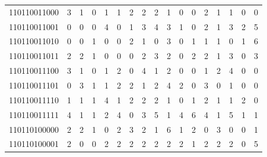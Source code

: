 \documentclass[10pt,a4paper]{article}
\begin{document}
\begin{longtable}{ |c|c|c|c|c|c|c|c|c|c|c|c|c|c|c|c|c| }
    110110011000              & 3                            & 1                                & 0                            & 1                              & 1   & 2   & 2   & 2   & 1   & 0   & 0   & 2   & 1   & 1   & 0   & 0   \\
    110110011001              & 0                            & 0                                & 0                            & 4                              & 0   & 1   & 3   & 4   & 3   & 1   & 0   & 2   & 1   & 3   & 2   & 5   \\
    110110011010              & 0                            & 0                                & 1                            & 0                              & 0   & 2   & 1   & 0   & 3   & 0   & 1   & 1   & 1   & 0   & 1   & 6   \\
    110110011011              & 2                            & 2                                & 1                            & 0                              & 0   & 0   & 2   & 3   & 2   & 0   & 2   & 2   & 1   & 3   & 0   & 3   \\
    110110011100              & 3                            & 1                                & 0                            & 1                              & 2   & 0   & 4   & 1   & 2   & 0   & 0   & 1   & 2   & 4   & 0   & 0   \\
    110110011101              & 0                            & 3                                & 1                            & 1                              & 2   & 2   & 1   & 2   & 4   & 2   & 0   & 3   & 0   & 1   & 0   & 0   \\
    110110011110              & 1                            & 1                                & 1                            & 4                              & 1   & 2   & 2   & 2   & 1   & 0   & 1   & 2   & 1   & 1   & 2   & 0   \\
    110110011111              & 4                            & 1                                & 1                            & 2                              & 4   & 0   & 3   & 5   & 1   & 4   & 6   & 4   & 1   & 5   & 1   & 1   \\
    110110100000              & 2                            & 2                                & 1                            & 0                              & 2   & 3   & 2   & 1   & 6   & 1   & 2   & 0   & 3   & 0   & 0   & 1   \\
    110110100001              & 2                            & 0                                & 0                            & 2                              & 2   & 2   & 2   & 2   & 2   & 2   & 1   & 2   & 2   & 2   & 0   & 5   \\

\end{longtable}
\end{document}
